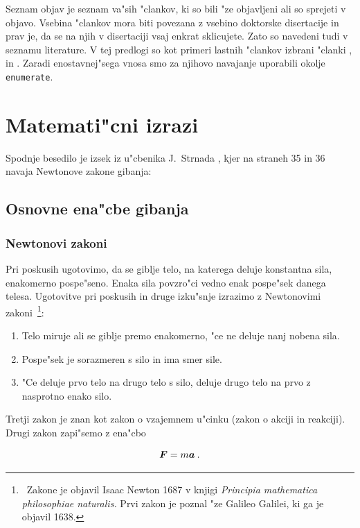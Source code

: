 
Seznam objav je seznam va"sih "clankov, ki so bili "ze objavljeni ali so sprejeti v objavo. 
Vsebina "clankov mora biti povezana z vsebino doktorske disertacije in prav je, da se na njih v disertaciji vsaj enkrat sklicujete. 
Zato so navedeni tudi v seznamu literature. V tej predlogi so kot primeri lastnih "clankov izbrani "clanki \cite{Multiple}, \cite{Variation} in \cite{Diffusion}. 
Zaradi enostavnej"sega vnosa smo za njihovo navajanje uporabili okolje {\tt enumerate}.


%
\chapter{Matemati"cni izrazi}
\label{chMa}

Spodnje besedilo je izsek iz u"cbenika J.~Strnada \cite{St}, kjer na straneh 35 in 36 navaja Newtonove zakone gibanja:

\section{Osnovne ena"cbe gibanja}
\subsection{Newtonovi zakoni}

Pri poskusih ugotovimo, da se giblje telo, na katerega deluje konstantna sila, enakomer\-no pospe"seno. 
Enaka sila povzro"ci vedno enak pospe"sek danega telesa.  
Ugotovitve pri poskusih in druge izku"snje izrazimo z Newtonovimi zakoni~\footnote{~Zakone je objavil Isaac Newton 1687 v knjigi {\it Principia mathematica philosophiae naturalis.}  Prvi zakon je poznal "ze Galileo Galilei, ki ga je objavil 1638.}:

\begin{enumerate}
\item{Telo miruje ali se giblje premo enakomerno, "ce ne deluje nanj nobena sila.}
\item{Pospe"sek je sorazmeren s silo in ima smer sile.}
\item{"Ce deluje prvo telo na drugo telo s silo, deluje drugo telo na prvo z nasprotno enako silo.}
\end{enumerate}

Tretji zakon je znan kot zakon o vzajemnem u"cinku (zakon o akciji in reakciji).
Drugi zakon zapi"semo z ena"cbo

\begin{equation}
{\hbox{\boldmath{$F$}}} = m {\hbox{\boldmath{$a$}}} \> .
\label{1NZ}
\end{equation}


